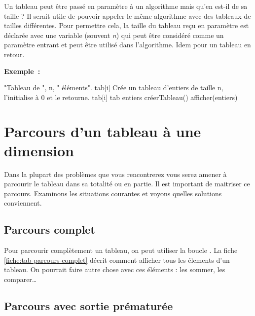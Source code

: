 		\medskip
		Un tableau peut être passé en paramètre à un algorithme 
		mais qu’en est-il de sa taille ? 
		Il serait utile de pouvoir appeler le même algorithme avec des
		tableaux de tailles différentes. 
		Pour permettre cela, la taille du tableau reçu en paramètre 
		est déclarée avec une variable (souvent \emph{n})
		qui peut être considéré comme un paramètre entrant
		et peut être utilisé dans l'algorithme.
		Idem pour un tableau en retour.
	
		\textbf{Exemple~:}
		
		\begin{LDA}
				\Write "Tableau de ", n, " éléments".
					\Write tab[i]
				\EndFor
			\EndAlgo
			\Empty
			\LComment Crée un tableau d'entiers de taille n, l'initialise à 0 et le retourne.
					\Let tab[i] 
				\EndFor
				\Return tab
			\EndAlgo
			\Empty
				\Let entiers \Gets créerTableau()
				\Stmt afficher(entiers)
			\EndAlgo
		\end{LDA}
					
	\section{Parcours d'un tableau à une dimension} 
	\label{Les parcours de tableaux}
	
		Dans la plupart des problèmes que vous rencontrerez
		vous serez amener à parcourir le tableau 
		dans sa totalité ou en partie.
		Il est important de maitriser ce parcours.
		Examinons les situations courantes 
		et voyons quelles solutions conviennent.
				
		\subsection{Parcours complet}
		
			Pour parcourir complètement un tableau, 
			on peut utiliser la boucle .
			La fiche \vref{fiche:tab-parcours-complet}
			décrit comment afficher tous les élements d'un tableau.
			On pourrait faire autre chose avec ces éléments :
			les sommer, les comparer\dots
		
		\subsection{Parcours avec sortie prématurée}
		
